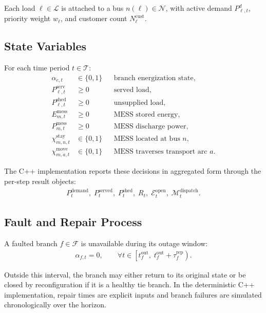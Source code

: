Each load $\ell\in\mathcal{L}$ is attached to a bus $n(\ell)\in\mathcal{N}$,
with active demand $P^{d}_{\ell,t}$, priority weight $w_{\ell}$, and customer
count $N^{\mathrm{cust}}_{\ell}$.

\subsection{State Variables}

For each time period $t\in\mathcal{T}$:
\begin{align}
\alpha_{e,t} &\in \{0,1\} && \text{branch energization state}, \\
P^{\mathrm{serv}}_{\ell,t} &\ge 0 && \text{served load}, \\
P^{\mathrm{shed}}_{\ell,t} &\ge 0 && \text{unsupplied load}, \\
E^{\mathrm{mess}}_{m,t} &\ge 0 && \text{MESS stored energy}, \\
P^{\mathrm{mess}}_{m,t} &\ge 0 && \text{MESS discharge power}, \\
\chi^{\mathrm{stay}}_{m,n,t} &\in \{0,1\} && \text{MESS located at bus }n, \\
\chi^{\mathrm{move}}_{m,a,t} &\in \{0,1\} && \text{MESS traverses transport arc }a.
\end{align}

The C++ implementation reports these decisions in aggregated form through the
per-step result objects:
\begin{align}
P^{\mathrm{demand}}_t,\;
P^{\mathrm{served}}_t,\;
P^{\mathrm{shed}}_t,\;
R_t,\;
\mathcal{E}^{\mathrm{open}}_t,\;
\mathcal{M}^{\mathrm{dispatch}}_t.
\end{align}

\subsection{Fault and Repair Process}

A faulted branch $f\in\mathcal{F}$ is unavailable during its outage window:
\begin{align}
\alpha_{f,t} = 0,
\qquad
\forall t\in\left[t^{\mathrm{out}}_f,\; t^{\mathrm{out}}_f + \tau^{\mathrm{rep}}_f\right).
\end{align}

Outside this interval, the branch may either return to its original state or be
closed by reconfiguration if it is a healthy tie branch. In the deterministic
C++ implementation, repair times are explicit inputs and branch failures are
simulated chronologically over the horizon.

